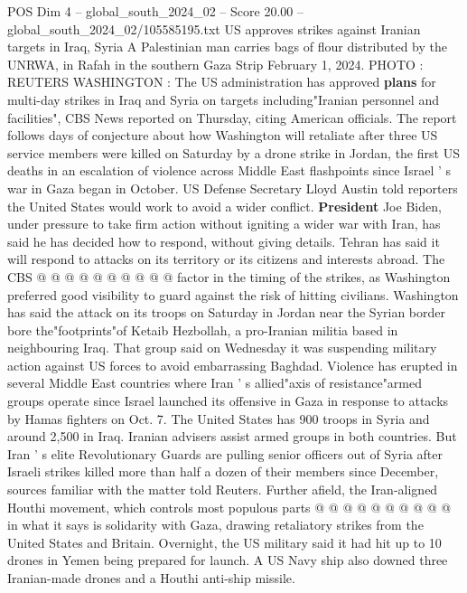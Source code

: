 \begin{textsample}{POS Dim 4 – global\_south\_2024\_02 – Score 20.00 – global\_south\_2024\_02/105585195.txt}  \label{ex:f4_pos_079}
US approves strikes against Iranian targets in Iraq, Syria A Palestinian man carries bags of flour distributed by the UNRWA, in Rafah in the southern Gaza Strip February 1, 2024.
PHOTO : REUTERS WASHINGTON : The US administration has approved \textbf{plans} for multi-day strikes in Iraq and Syria on targets including"Iranian personnel and facilities", CBS News reported on Thursday, citing American officials.
The report follows days of conjecture about how Washington will retaliate after three US service members were killed on Saturday by a drone strike in Jordan, the first US deaths in an escalation of violence across Middle East flashpoints since Israel ' s war in Gaza began in October.
US Defense Secretary Lloyd Austin told reporters the United States would work to avoid a wider conflict. \textbf{President} Joe Biden, under pressure to take firm action without igniting a wider war with Iran, has said he has decided how to respond, without giving details.
Tehran has said it will respond to attacks on its territory or its citizens and interests abroad.
The CBS @ @ @ @ @ @ @ @ @ @ factor in the timing of the strikes, as Washington preferred good visibility to guard against the risk of hitting civilians.
Washington has said the attack on its troops on Saturday in Jordan near the Syrian border bore the"footprints"of Ketaib Hezbollah, a pro-Iranian militia based in neighbouring Iraq.
That group said on Wednesday it was suspending military action against US forces to avoid embarrassing Baghdad.
Violence has erupted in several Middle East countries where Iran ' s allied"axis of resistance"armed groups operate since Israel launched its offensive in Gaza in response to attacks by Hamas fighters on Oct. 7.
The United States has 900 troops in Syria and around 2,500 in Iraq.
Iranian advisers assist armed groups in both countries.
But Iran ' s elite Revolutionary Guards are pulling senior officers out of Syria after Israeli strikes killed more than half a dozen of their members since December, sources familiar with the matter told Reuters.
Further afield, the Iran-aligned Houthi movement, which controls most populous parts @ @ @ @ @ @ @ @ @ @ in what it says is solidarity with Gaza, drawing retaliatory strikes from the United States and Britain.
Overnight, the US military said it had hit up to 10 drones in Yemen being prepared for launch.
A US Navy ship also downed three Iranian-made drones and a Houthi anti-ship missile.

\end{textsample}
